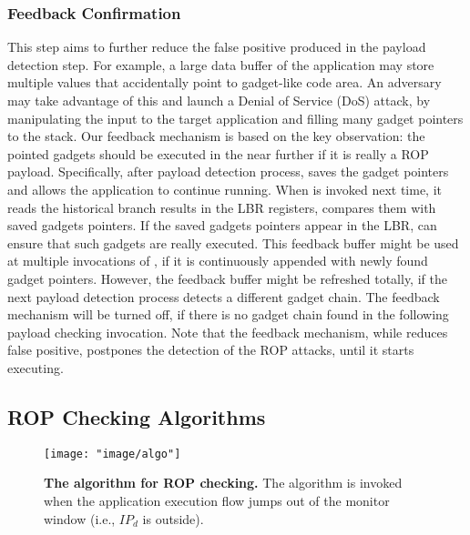 \subsubsection{Feedback Confirmation}\label{sec:feedback}
This step aims to further reduce the false positive produced in the payload detection step.
For example, a large data buffer of the application may store multiple values
that accidentally point to gadget-like code area.
An adversary may take advantage of this and launch a Denial of Service (DoS) attack,
by manipulating the input to the target application and filling many gadget pointers
to the stack. Our feedback mechanism is based on the key observation:
the pointed gadgets should be executed in the near further if it is really a ROP payload.
Specifically, after payload detection process, \name saves the gadget pointers and
allows the application to continue running. When \name is invoked next time, it
reads the historical branch results in the LBR registers,
compares them with saved gadgets pointers. If the saved gadgets pointers appear
in the LBR, \name can ensure that such gadgets are really executed.
This feedback buffer might be used at multiple invocations of \name, if
it is continuously appended with newly found gadget pointers.
However, the feedback buffer
might be refreshed totally, if the next payload detection process detects a different
gadget chain. The feedback mechanism will be turned off, if there is no gadget
chain found in the following payload checking invocation.
Note that the feedback mechanism, while reduces false positive, postpones
the detection of the ROP attacks, until it starts executing.


\subsection{ROP Checking Algorithms} \label{sec:algo}

\begin{figure}[!ht]
 \centering
\texttt{[image: "image/algo"]}
\caption{\textbf{The algorithm for ROP checking.} The algorithm is invoked when
the application execution flow jumps out of the monitor window (i.e., $IP_d$ is outside).}
\label{fig:algo}
\end{figure}

